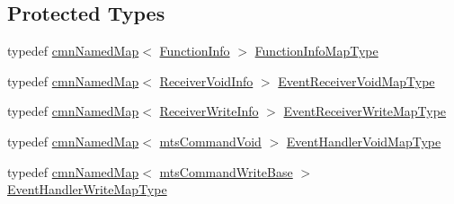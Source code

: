 \subsection*{Protected Types}
\begin{DoxyCompactItemize}
\item 
typedef \hyperlink{classcmn_named_map}{cmn\+Named\+Map}$<$ \hyperlink{classmts_interface_required_ade456f015f7ec3569d23f4a29a147ede}{Function\+Info} $>$ \hyperlink{classmts_interface_required_a4c21eaf53811c5782bae6293904cffe5}{Function\+Info\+Map\+Type}
\item 
typedef \hyperlink{classcmn_named_map}{cmn\+Named\+Map}$<$ \hyperlink{classmts_interface_required_a7ddf0b5c0205b5a512562171275ff1c3}{Receiver\+Void\+Info} $>$ \hyperlink{classmts_interface_required_a4f0c15e3c51f635a969eb8706a55afb1}{Event\+Receiver\+Void\+Map\+Type}
\item 
typedef \hyperlink{classcmn_named_map}{cmn\+Named\+Map}$<$ \hyperlink{classmts_interface_required_a66d230e43ed3c2bb07f0593a997f06cc}{Receiver\+Write\+Info} $>$ \hyperlink{classmts_interface_required_a58a4a6a94697fbb23d2884cf6cbf2a0b}{Event\+Receiver\+Write\+Map\+Type}
\item 
typedef \hyperlink{classcmn_named_map}{cmn\+Named\+Map}$<$ \hyperlink{classmts_command_void}{mts\+Command\+Void} $>$ \hyperlink{classmts_interface_required_a1f6cca73d8dffb794e3778092b375783}{Event\+Handler\+Void\+Map\+Type}
\item 
typedef \hyperlink{classcmn_named_map}{cmn\+Named\+Map}$<$ \hyperlink{classmts_command_write_base}{mts\+Command\+Write\+Base} $>$ \hyperlink{classmts_interface_required_a8ea82ecaf05dc0aca4595ac685b8a43f}{Event\+Handler\+Write\+Map\+Type}
\end{DoxyCompactItemize}
